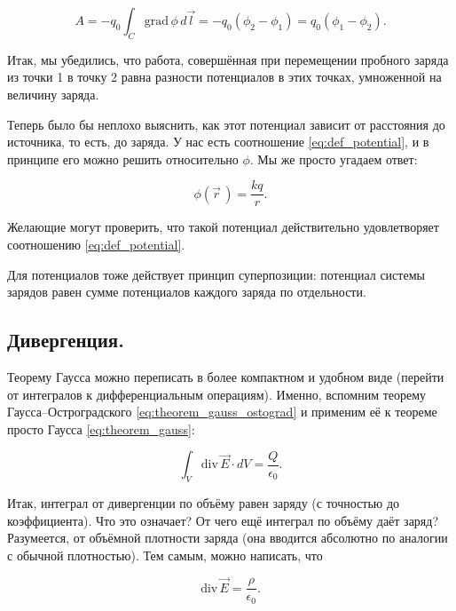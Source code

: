 \documentclass[11pt,a4paper]{article}
\numberwithin{equation}{section}
\newcommand{\grad}{\mathrm{grad}\,}
\renewcommand{\div}{\mathrm{div}\,}
\newcommand{\eps}{\epsilon}
\begin{document}
\begin{equation}
  \label{eq:work_statics_2}
  A = -q_0 \int_C \grad \phi\, d\vec{l} = -q_0 (\phi_2 - \phi_1) = q_0
  (\phi_1 - \phi_2). 
\end{equation}

Итак, мы убедились, что работа, совершённая при перемещении пробного
заряда из точки 1 в точку 2 равна разности потенциалов в этих точках,
умноженной на величину заряда. 

Теперь было бы неплохо выяснить, как этот потенциал зависит от
расстояния до источника, то есть, до заряда. У нас есть соотношение
\eqref{eq:def_potential}, и в принципе его можно решить относительно
$\phi$. Мы же просто угадаем ответ:

\begin{equation}
  \label{eq:potential_r}
  \phi(\vec{r}\,) = \frac{kq}{r}. 
\end{equation}

Желающие могут проверить, что такой потенциал действительно
удовлетворяет соотношению \eqref{eq:def_potential}. 

Для потенциалов тоже действует принцип суперпозиции: потенциал системы
зарядов равен сумме потенциалов каждого заряда по отдельности. 

\subsection{Дивергенция.}
\label{sec:statics_div}

Теорему Гаусса можно переписать в более компактном и удобном виде
(перейти от интегралов к дифференциальным операциям). Именно, вспомним
теорему Гаусса--Остроградского \eqref{eq:theorem_gauss_ostograd} и
применим её к теореме просто Гаусса \eqref{eq:theorem_gauss}:

\begin{equation}
  \label{eq:statics_div_1}
  \int_V \div \vec{E} \cdot dV = \frac{Q}{\eps_0}.
\end{equation}

Итак, интеграл от дивергенции по объёму равен заряду (с точностью до
коэффициента). Что это означает? От чего ещё интеграл по объёму даёт
заряд? Разумеется, от объёмной плотности заряда (она вводится
абсолютно по аналогии с обычной плотностью). Тем самым, можно
написать, что 

\begin{equation}
  \label{eq:statics_div_2}
  \div \vec{E} = \frac{\rho}{\eps_0}.
\end{equation}
\end{document}
